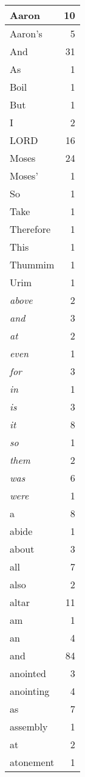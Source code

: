 \begin{center}
\begin{longtable}{l|r}
\hline \hline
\endlastfoot
Aaron & 10 \\ \hline
Aaron's & 5 \\ \hline
And & 31 \\ \hline
As & 1 \\ \hline
Boil & 1 \\ \hline
But & 1 \\ \hline
I & 2 \\ \hline
LORD & 16 \\ \hline
Moses & 24 \\ \hline
Moses' & 1 \\ \hline
So & 1 \\ \hline
Take & 1 \\ \hline
Therefore & 1 \\ \hline
This & 1 \\ \hline
Thummim & 1 \\ \hline
Urim & 1 \\ \hline
\emph{above} & 2 \\ \hline
\emph{and} & 3 \\ \hline
\emph{at} & 2 \\ \hline
\emph{even} & 1 \\ \hline
\emph{for} & 3 \\ \hline
\emph{in} & 1 \\ \hline
\emph{is} & 3 \\ \hline
\emph{it} & 8 \\ \hline
\emph{so} & 1 \\ \hline
\emph{them} & 2 \\ \hline
\emph{was} & 6 \\ \hline
\emph{were} & 1 \\ \hline
a & 8 \\ \hline
abide & 1 \\ \hline
about & 3 \\ \hline
all & 7 \\ \hline
also & 2 \\ \hline
altar & 11 \\ \hline
am & 1 \\ \hline
an & 4 \\ \hline
and & 84 \\ \hline
anointed & 3 \\ \hline
anointing & 4 \\ \hline
as & 7 \\ \hline
assembly & 1 \\ \hline
at & 2 \\ \hline
atonement & 1 \\ \hline

\end{longtable}
\end{center}
